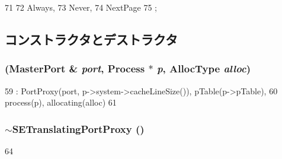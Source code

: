 \begin{DoxyCode}
71                    {
72         Always,
73         Never,
74         NextPage
75     };
\end{DoxyCode}


\subsection{コンストラクタとデストラクタ}
\hypertarget{classSETranslatingPortProxy_a53496e09221903975c88c46e55e99d73}{
\subsubsection[{SETranslatingPortProxy}]{ ({\bf MasterPort} \& {\em port}, \/  {\bf Process} $\ast$ {\em p}, \/  {\bf AllocType} {\em alloc})}}
\label{classSETranslatingPortProxy_a53496e09221903975c88c46e55e99d73}



\begin{DoxyCode}
59     : PortProxy(port, p->system->cacheLineSize()), pTable(p->pTable),
60       process(p), allocating(alloc)
61 { }
\end{DoxyCode}
\hypertarget{classSETranslatingPortProxy_a4e9827ea13aa7de2eb20fb37cf6d0edb}{
\subsubsection[{$\sim$SETranslatingPortProxy}]{\setlength{\rightskip}{0pt plus 5cm}$\sim${\bf SETranslatingPortProxy} ()}}
\label{classSETranslatingPortProxy_a4e9827ea13aa7de2eb20fb37cf6d0edb}



\begin{DoxyCode}
64 { }
\end{DoxyCode}


